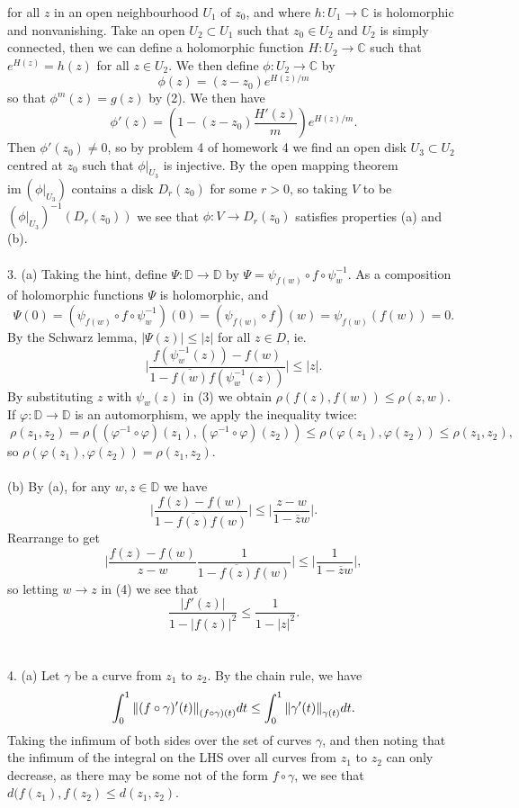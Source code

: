 \documentclass{article}
\newcommand{\C}{\mathbb{C}}
\newcommand{\D}{\mathbb{D}}
\begin{document}
for all $z$ in an open neighbourhood $U_1$ of $z_0$, and where $h:U_1 \to \C$ is holomorphic and nonvanishing. Take an open $U_2 \subset U_1$ such that $z_0 \in U_2$ and $U_2$ is simply connected, then we can define a holomorphic function $H:U_2 \to \C$ such that $e^{H(z)} = h(z)$ for all $z\in U_2$. We then define $\phi: U_2 \to \C$ by  
$$
\phi(z) = (z-z_0)e^{H(z)/m}
$$
so that $\phi^m(z) = g(z)$ by (2).
We then have 
$$\phi'(z) = (1-(z-z_0)\frac{H'(z)}{m})e^{H(z)/m}.$$
Then $\phi'(z_0) \neq 0$, so by problem 4 of homework 4 we find an open disk $U_3\subset U_2$ centred at $z_0$ such that $\phi|_{U_3}$ is injective. By the open mapping theorem $\text{im}\:( \phi|_{U_3})$ contains a disk $D_r(z_0)$ for some $r>0$, so taking $V$ to be $(\phi|_{U_3})^{-1}(D_r(z_0))$ we see that $\phi:V \to D_r(z_0)$ satisfies properties (a) and (b).
\\ \\
3. (a) Taking the hint, define $\Psi:\D \to \D$ by $\Psi = \psi_{f(w)} \circ f \circ \psi_w^{-1}$. As a composition of holomorphic functions $\Psi$ is holomorphic, and 
$$
\Psi(0) = (\psi_{f(w)} \circ f \circ \psi_{w}^{-1})(0) = (\psi_{f(w)} \circ f)(w) = \psi_{f(w)}(f(w)) = 0. 
$$
By the Schwarz lemma, $|\Psi(z)|\leq |z|$ for all $z\in D$, ie. 
\begin{equation}
\Big| \frac{f(\psi_w^{-1}(z))-f(w)}{1-\overline{f(w)}f(\psi_{w}^{-1}(z))} \Big| \leq |z|.
\end{equation}
By substituting $z$ with $\psi_w(z)$ in (3)
we obtain $\rho(f(z), f(w)) \leq \rho(z,w)$. If $\varphi: \D \to \D$ is an automorphism, we apply the inequality twice:
$$\
\rho(z_1,z_2) = \rho ((\varphi^{-1} \circ \varphi)(z_1), (\varphi^{-1} \circ \varphi)(z_2)) \leq \rho(\varphi(z_1),\varphi(z_2)) \leq \rho(z_1, z_2),
$$
so $\rho(\varphi(z_1),\varphi(z_2)) = \rho(z_1,z_2)$.
\\ \\
(b) By (a), for any $w,z \in \D$ we have 
$$
\Big| \frac{f(z) -f(w)}{1-\overline{f(z)}f(w)} \Big| \leq \Big| \frac{z-w}{1-\overline{z}w} \Big|. 
$$
Rearrange to get
\begin{equation}
    \Big| \frac{f(z)-f(w)}{z-w} \frac{1}{1-\overline{f(z)}f(w)}\Big| \leq \Big| \frac{1}{1-\overline{z}w} \Big|, 
\end{equation}
so letting $w\to z$ in (4)
we see that 
$$
\frac{|f'(z)|}{1-|f(z)|^2} \leq \frac{1}{1-|z|^2}.
$$
\\\\
4. (a) Let $\gamma$ be a curve from $z_1$ to $z_2$. By the chain rule, we have $$\int_0^1 \norm{(f\circ \gamma)'(t)}_{(f \circ \gamma)(t)} dt \leq \int_0^1 \norm{\gamma'(t)}_{\gamma(t)}dt.$$ Taking the infimum of both sides over the set of curves $\gamma$, and then noting that the infimum of the integral on the LHS over all curves from $z_1$ to $z_2$ can only decrease, as there may be some not of the form $f\circ \gamma$, we see that $d(f(z_1), f(z_2) \leq d(z_1,z_2)$.
\end{document}
